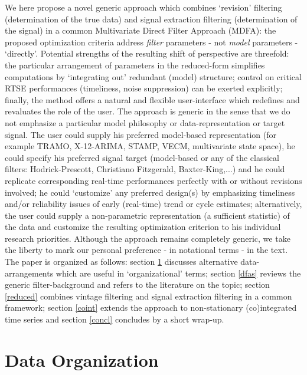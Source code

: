 \documentclass[11pt]{article}
\begin{document}
We here propose a novel generic approach which combines `revision' filtering (determination of the true data) and signal extraction filtering (determination of the signal) in a common Multivariate Direct Filter Approach (MDFA): the proposed optimization criteria address \emph{filter} parameters - not \emph{model} parameters - `directly'. Potential strengths of the resulting shift of perspective are threefold: the particular arrangement of parameters in the reduced-form simplifies computations by `integrating out' redundant (model) structure; control on critical RTSE performances (timeliness, noise suppression) can be exerted explicitly; finally, the method offers a natural and flexible user-interface which redefines and revaluates the role of the user. The approach is generic in the sense that we do not emphasize a particular model philosophy or data-representation or target signal. The user could supply his preferred model-based representation (for example TRAMO, X-12-ARIMA, STAMP, VECM, multivariate state space), he could specify his preferred signal target (model-based or any of the classical filters: Hodrick-Prescott, Christiano Fitzgerald, Baxter-King,...) and he could replicate corresponding real-time performances perfectly with or without revisions involved; he could `customize' any preferred design(s) by emphasizing timeliness and/or reliability issues of early (real-time) trend or cycle estimates; alternatively, the user could supply a non-parametric representation (a sufficient statistic) of the data and customize the resulting optimization criterion to his individual research priorities. Although the approach remains completely generic, we take the liberty to mark our personal preference - in notational terms - in the text.\\






The paper is organized as follows: section \ref{data} discusses alternative data-arrangements which are useful in `organizational' terms; section \ref{dfas} reviews the generic filter-background and refers to the literature on the topic; section \ref{reduced} combines vintage filtering and signal extraction filtering in a common framework; section \ref{coint} extends the approach to non-stationary (co)integrated time series and section \ref{concl} concludes by a short wrap-up.\\






\section{Data Organization}\label{data}
\end{document}
